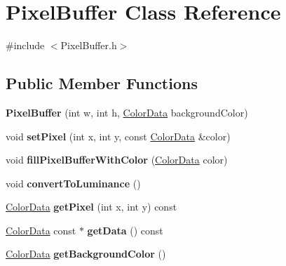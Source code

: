 \hypertarget{classPixelBuffer}{\section{Pixel\-Buffer Class Reference}
\label{classPixelBuffer}
}


{\ttfamily \#include $<$Pixel\-Buffer.\-h$>$}

\subsection*{Public Member Functions}
\begin{DoxyCompactItemize}
\item 
\hypertarget{classPixelBuffer_ae373904fcdd3c820677b959354b75410}{{\bfseries Pixel\-Buffer} (int w, int h, \hyperlink{classColorData}{Color\-Data} background\-Color)}\label{classPixelBuffer_ae373904fcdd3c820677b959354b75410}

\item 
\hypertarget{classPixelBuffer_abe673364dfceec95783e1dfb00ec9bd1}{void {\bfseries set\-Pixel} (int x, int y, const \hyperlink{classColorData}{Color\-Data} \&color)}\label{classPixelBuffer_abe673364dfceec95783e1dfb00ec9bd1}

\item 
\hypertarget{classPixelBuffer_a1bdab74553ab7d569629a42a808b4785}{void {\bfseries fill\-Pixel\-Buffer\-With\-Color} (\hyperlink{classColorData}{Color\-Data} color)}\label{classPixelBuffer_a1bdab74553ab7d569629a42a808b4785}

\item 
\hypertarget{classPixelBuffer_a73f0518c147ad7900a64b4ffa205b9fc}{void {\bfseries convert\-To\-Luminance} ()}\label{classPixelBuffer_a73f0518c147ad7900a64b4ffa205b9fc}

\item 
\hypertarget{classPixelBuffer_ae01450fb4e9824c1e93e92f4377e9924}{\hyperlink{classColorData}{Color\-Data} {\bfseries get\-Pixel} (int x, int y) const }\label{classPixelBuffer_ae01450fb4e9824c1e93e92f4377e9924}

\item 
\hypertarget{classPixelBuffer_a4b9ebe9181f451aa7c9858e400245e73}{\hyperlink{classColorData}{Color\-Data} const $\ast$ {\bfseries get\-Data} () const }\label{classPixelBuffer_a4b9ebe9181f451aa7c9858e400245e73}

\item 
\hypertarget{classPixelBuffer_a7eadc0d458fec5d0e0f502d279b86ea7}{\hyperlink{classColorData}{Color\-Data} {\bfseries get\-Background\-Color} ()}\label{classPixelBuffer_a7eadc0d458fec5d0e0f502d279b86ea7}


\end{DoxyCompactItemize}

